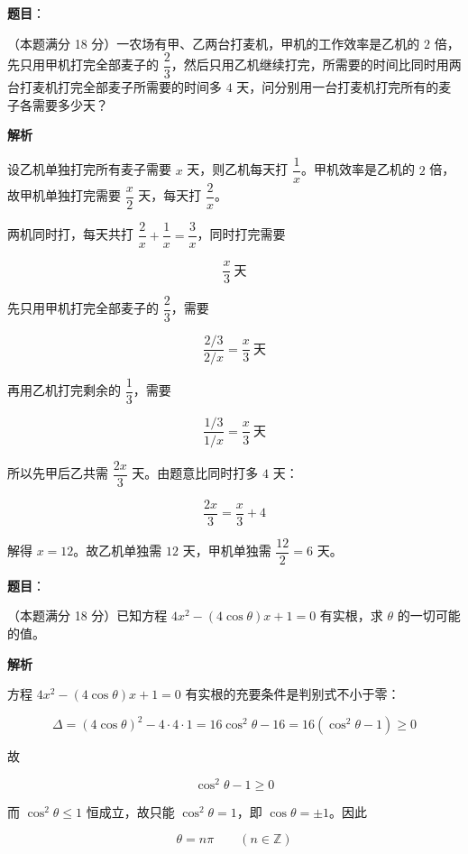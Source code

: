 \begin{answer}

\textbf{题目}：

（本题满分 18 分）一农场有甲、乙两台打麦机，甲机的工作效率是乙机的 $2$ 倍，先只用甲机打完全部麦子的 $\dfrac23$，然后只用乙机继续打完，所需要的时间比同时用两台打麦机打完全部麦子所需要的时间多 $4$ 天，问分别用一台打麦机打完所有的麦子各需要多少天？

\textbf{解析}

设乙机单独打完所有麦子需要 $x$ 天，则乙机每天打 $\dfrac1x$。甲机效率是乙机的 $2$ 倍，故甲机单独打完需要 $\dfrac{x}{2}$ 天，每天打 $\dfrac2x$。

两机同时打，每天共打 $\dfrac2x+\dfrac1x=\dfrac3x$，同时打完需要

\nopagebreak[4]
\[
\frac{x}{3}\ \text{天}
\]

先只用甲机打完全部麦子的 $\dfrac23$，需要

\nopagebreak[4]
\[
\frac{2/3}{2/x}=\frac{x}{3}\ \text{天}
\]

再用乙机打完剩余的 $\dfrac13$，需要

\nopagebreak[4]
\[
\frac{1/3}{1/x}=\frac{x}{3}\ \text{天}
\]

所以先甲后乙共需 $\dfrac{2x}{3}$ 天。由题意比同时打多 $4$ 天：

\nopagebreak[4]
\[
\frac{2x}{3}=\frac{x}{3}+4
\]

解得 $x=12$。故乙机单独需 $12$ 天，甲机单独需 $\dfrac{12}{2}=6$ 天。


\end{answer}
\begin{answer}

\textbf{题目}：

（本题满分 18 分）已知方程 $4x^2-(4\cos\theta)x+1=0$ 有实根，求 $\theta$ 的一切可能的值。

\textbf{解析}

方程 $4x^2-(4\cos\theta)x+1=0$ 有实根的充要条件是判别式不小于零：

\nopagebreak[4]
\[
\Delta=(4\cos\theta)^2-4\cdot4\cdot1=16\cos^2\theta-16=16(\cos^2\theta-1)\ge0
\]

故

\nopagebreak[4]
\[
\cos^2\theta-1\ge0
\]

而 $\cos^2\theta\le1$ 恒成立，故只能 $\cos^2\theta=1$，即 $\cos\theta=\pm1$。因此

\nopagebreak[4]
\[
\theta=n\pi\qquad(n\in\mathbb Z)
\]


\end{answer}
